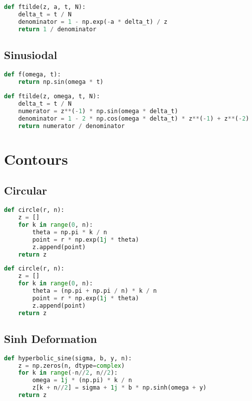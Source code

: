 \begin{appendices}
\begin{lstlisting}[language=Python, caption= Implementation of the Decaying Exp function and its $\mathcal{Z}$-transform (Section \ref{section:decaying_exp})]
def ftilde(z, a, t, N):
    delta_t = t / N
    denominator = 1 - np.exp(-a * delta_t) / z
    return 1 / denominator
\end{lstlisting}

\newpage
\subsection{Sinusiodal}
\begin{lstlisting}[language=Python, caption= Implementation of the Sinusoidal function and its $\mathcal{Z}$-transform (Section \ref{section:sinusoidal})]
def f(omega, t):
    return np.sin(omega * t)
    
def ftilde(z, omega, t, N):
    delta_t = t / N
    numerator = z**(-1) * np.sin(omega * delta_t)
    denominator = 1 - 2 * np.cos(omega * delta_t) * z**(-1) + z**(-2)
    return numerator / denominator
\end{lstlisting}

\newpage
\section{Contours}

\subsection{Circular}
\begin{lstlisting}[language=Python, caption= null]
def circle(r, n):
    z = []
    for k in range(0, n):
        theta = np.pi * k / n
        point = r * np.exp(1j * theta)
        z.append(point)
    return z
\end{lstlisting}

\begin{lstlisting}[language=Python, caption= null]
def circle(r, n):
    z = []
    for k in range(0, n):
        theta = (np.pi + np.pi / n) * k / n
        point = r * np.exp(1j * theta)
        z.append(point)
    return z
\end{lstlisting}

\subsection{Sinh Deformation}
\begin{lstlisting}[language=Python, caption= null]
def hyperbolic_sine(sigma, b, y, n):
    z = np.zeros(n, dtype=complex)
    for k in range(-n//2, n//2):
        omega = 1j * (np.pi) * k / n
        z[k + n//2] = sigma + 1j * b * np.sinh(omega + y)
    return z
\end{lstlisting}


\end{appendices}
